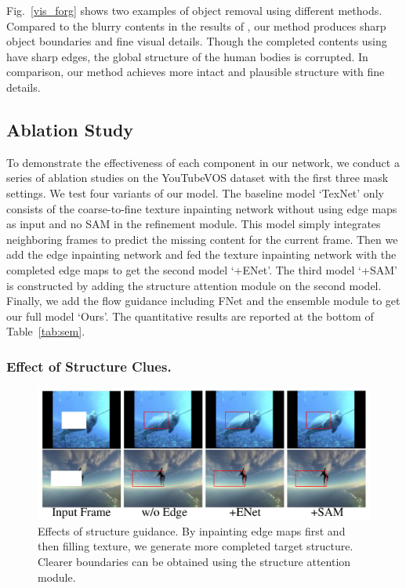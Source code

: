 Fig.~\ref{vis_forg} shows two examples of object removal using different methods. 
Compared to the blurry contents in the results of \cite{nazeri2019edgeconnect,wang2019video,Kim_2019_CVPR1}, our method produces sharp object boundaries and fine visual details. 
Though the completed contents using \cite{Xu_2019_CVPR} have sharp edges, the global structure of the human bodies is corrupted. In comparison, our method achieves more intact and plausible structure with fine details.





\subsection{Ablation Study}
To demonstrate the effectiveness of each component in our network, we conduct a series of ablation studies on the YouTubeVOS dataset with the first three mask settings. 
%
We test four variants of our model. 
The baseline model `TexNet' only consists of the coarse-to-fine texture inpainting network without using edge maps as input and no SAM in the refinement module.
This model simply integrates neighboring frames to predict the missing content for the current frame.
%
Then we add the edge inpainting network and fed the texture inpainting network with the completed edge maps to get the second model `+ENet'.
The third model `+SAM' is constructed by adding the structure attention module on the second model. 
Finally, we add the flow guidance including FNet and the ensemble module to get our full model `Ours'.
The quantitative results are reported at the bottom of Table~\ref{tab:sem}. 


\subsubsection{Effect of Structure Clues.}


\begin{figure}[!ht]
	\centering
	\includegraphics[width=0.97\columnwidth]{edgevis} %
	\caption{Effects of structure guidance. By inpainting edge maps first and then filling texture, we generate more completed target structure. Clearer boundaries can be obtained using the structure attention module.}
	\label{edgevis}
\end{figure}



